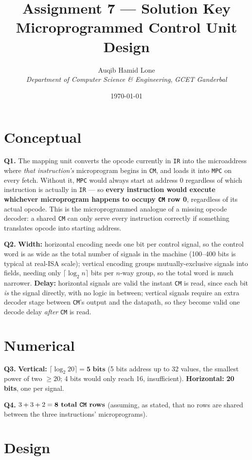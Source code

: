 \documentclass[11pt]{article}
\title{Assignment 7 --- Solution Key\\\large Microprogrammed Control Unit Design}
\author{Auqib Hamid Lone\\[0.3em]
  \emph{Department of Computer Science \& Engineering}, \emph{GCET Ganderbal}}
\date{\today}
\begin{document}
\maketitle

\section{Conceptual}

\textbf{Q1.} The mapping unit converts the opcode currently in \texttt{IR} into the microaddress where \emph{that instruction's} microprogram begins in \texttt{CM}, and loads it into \texttt{MPC} on every fetch. Without it, \texttt{MPC} would always start at address 0 regardless of which instruction is actually in \texttt{IR} --- so \textbf{every instruction would execute whichever microprogram happens to occupy \texttt{CM} row 0}, regardless of its actual opcode. This is the microprogrammed analogue of a missing opcode decoder: a shared \texttt{CM} can only serve every instruction correctly if something translates opcode into starting address.

\textbf{Q2.} \textbf{Width:} horizontal encoding needs one bit per control signal, so the control word is as wide as the total number of signals in the machine (100--400 bits is typical at real-ISA scale); vertical encoding groups mutually-exclusive signals into fields, needing only $\lceil \log_2 n \rceil$ bits per $n$-way group, so the total word is much narrower. \textbf{Delay:} horizontal signals are valid the instant \texttt{CM} is read, since each bit \emph{is} the signal directly, with no logic in between; vertical signals require an extra decoder stage between \texttt{CM}'s output and the datapath, so they become valid one decode delay \emph{after} \texttt{CM} is read.

\section{Numerical}

\textbf{Q3.} \textbf{Vertical:} $\lceil \log_2 20 \rceil = \textbf{5 bits}$ (5 bits address up to 32 values, the smallest power of two $\geq 20$; 4 bits would only reach 16, insufficient). \textbf{Horizontal:} \textbf{20 bits}, one per signal.

\textbf{Q4.} $3 + 3 + 2 = \textbf{8 total \texttt{CM} rows}$ (assuming, as stated, that no rows are shared between the three instructions' microprograms).

\section{Design}
\end{document}

